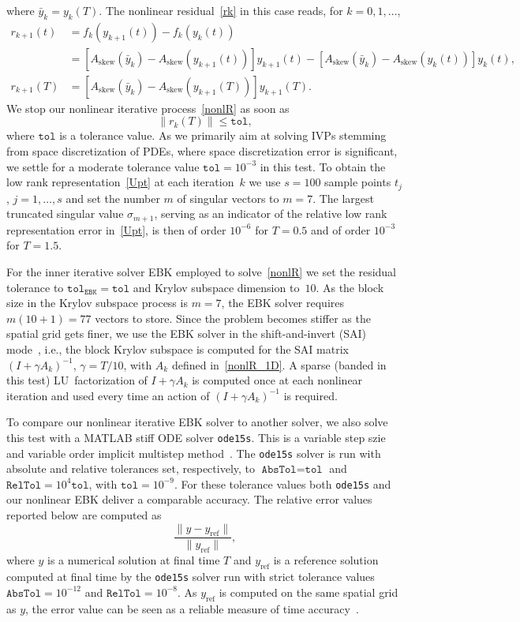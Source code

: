 \documentclass[sn-aps]{sn-jnl}
\theoremstyle{thmstyleone}%
\theoremstyle{thmstyletwo}%
\theoremstyle{thmstylethree}%
\newcommand{\Askew}{A_{\mathrm{skew}}}
\begin{document}
where $\bar{y}_k=y_k(T)$.
The nonlinear residual~\eqref{rk} in this case reads, for
$k=0,1,\dots$,
\begin{align*}
r_{k+1}(t) &= f_k(y_{k+1}(t)) - f_k(y_{k}(t))\\
          &= 
\left[\Askew (\bar{y}_{k}) - \Askew (y_{k+1}(t))\right]y_{k+1}(t) -
\left[\Askew (\bar{y}_{k}) - \Askew (y_k(t))\right]y_k(t),
\\
r_{k+1}(T) &= \left[\Askew (\bar{y}_k) - \Askew (y_{k+1}(T))\right]y_{k+1}(T).
\end{align*}
We stop our nonlinear iterative process~\eqref{nonlR} as soon as
$$
\|r_k(T)\|\leqslant \texttt{tol},
$$ 
where $\texttt{tol}$ is a tolerance value.
As we primarily aim at solving IVPs stemming from space discretization of PDEs,
where space discretization error is significant,
we settle for a moderate tolerance value $\texttt{tol}=10^{-3}$
in this test.
To obtain the low rank representation~\eqref{Upt} at each iteration~$k$
we use $s=100$ sample points $t_j$, $j=1,\dots,s$ and set the number $m$ of 
singular vectors to $m=7$.
The largest truncated singular value $\sigma_{m+1}$, serving as an indicator
of the relative low rank representation error in~\eqref{Upt}, is then of order $10^{-6}$ 
for $T=0.5$ and of order $10^{-3}$ for $T=1.5$.

For the inner iterative solver EBK employed to solve~\eqref{nonlR} we set
the residual tolerance to $\texttt{tol}_{\mathtt{EBK}}=\texttt{tol}$
and Krylov subspace dimension to~$10$.   As the block size
in the Krylov subspace process is $m=7$, the EBK solver requires $m(10+1)=77$
vectors to store.
Since the problem becomes stiffer as the spatial grid gets finer, we use the EBK solver
in the shift-and-invert (SAI) mode~\cite{EshofHochbruck06}, i.e., 
the block Krylov subspace is computed
for the SAI matrix $(I+\gamma A_k)^{-1}$, $\gamma=T/10$, with $A_k$ defined in~\eqref{nonlR_1D}.
A sparse (banded in this test) LU~factorization of $I+\gamma A_k$ is computed once
at each nonlinear iteration and used every time an action of $(I+\gamma A_k)^{-1}$ is required.

To compare our nonlinear iterative EBK solver to another solver,
we also solve this test with a MATLAB stiff ODE solver \texttt{ode15s}.
This is a variable step szie and variable order implicit multistep 
method~\cite{ODEsuite}.  The \texttt{ode15s} solver is run with
absolute and relative tolerances set, respectively, to
$\texttt{AbsTol} = \texttt{tol}$ and $\texttt{RelTol} = 10^4 \texttt{tol}$,
with $\texttt{tol}=10^{-9}$.
For these tolerance values both \texttt{ode15s} and our nonlinear EBK
deliver a comparable accuracy.  The relative error values reported below are computed 
as 
\begin{equation}
\label{err_reached}
\frac{\|y-y_{\mathrm{ref}}\|}{\|y_{\mathrm{ref}}\|},
\end{equation}
where $y$ is a numerical solution at final time $T$ and $y_{\mathrm{ref}}$ 
is a reference solution computed at final time by the \texttt{ode15s}
solver run with strict tolerance values 
$\texttt{AbsTol} = 10^{-12}$ and $\texttt{RelTol} = 10^{-8}$.
As $y_{\mathrm{ref}}$ is computed on the same spatial grid as $y$, the error value can be seen
as a reliable measure of time accuracy~\cite{RKC97}.
\end{document}
